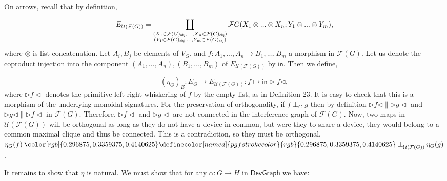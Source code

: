 \documentclass[10pt,a4paper]{article}
\begin{document}
On arrows, recall that by definition,\par
    \[E_{\mathcal{U}(\mathcal{F}(G))}=\coprod_{\begin{subarray}{c}(X_{1}\in\mathcal{F}(G)_{\mathsf{obj}},...,X_{n}\in\mathcal{F}(G)_{\mathsf{obj}})\\
(Y_{1}\in\mathcal{F}(G)_{\mathsf{obj}},...,Y_{m}\in\mathcal{F}(G)_{\mathsf{obj}})\end{subarray}}\mathcal{F}G(X_{1}\otimes...\otimes X_{n};Y_{1}\otimes...\otimes Y_{m}),\]    
where $\otimes$ is list concatenation. Let $A_{i},B_{j}$ be elements of $V_{G}$, and $f:A_{1},...,A_{n}\to B_{1},...,B_{m}$ a morphism in $\mathcal{F}(G)$. Let us denote the coproduct injection into the component $(A_{1},...,A_{n}),(B_{1},...,B_{m})$ of $E_{\mathcal{U}(\mathcal{F}(G))}$ by $\mathsf{in}$. Then we define,\par
    \[(\eta_{G})_{E}:E_{G}\to E_{\mathcal{U}(\mathcal{F}(G))}:f\mapsto{\mathsf{in}}\triangleright f\triangleleft,\]    
where $\triangleright f\triangleleft$ denotes the primitive left-right whiskering of $f$ by the empty list, as in Definition 23. It is easy to check that this is a morphism of the underlying monoidal signatures. For the preservation of orthogonality, if $f\perp_{G}g$ then by definition $\triangleright f\triangleleft\parallel\triangleright g\triangleleft$ and $\triangleright g\triangleleft\parallel\triangleright f\triangleleft$ in $\mathcal{F}(G)$. Therefore, $\triangleright f\triangleleft$ and $\triangleright g\triangleleft$ are not connected in the interference graph of $\mathcal{F}(G)$. Now, two maps in $\mathcal{U}(\mathcal{F}(G))$ will be orthogonal as long as they do not have a device in common, but were they to share a device, they would belong to a common maximal clique and thus be connected. This is a contradiction, so they must be orthogonal, $\eta_{G}(f)\mathbin{{\color[rgb]{0.296875,0.3359375,0.4140625}\definecolor[named]{pgfstrokecolor}{rgb}{0.296875,0.3359375,0.4140625}\perp}_{\mathcal{U}(\mathcal{F}(G))}}\eta_{G}(g)$.\par
 
 
 
It remains to show that $\eta$ is natural. We must show that for any $\alpha:G\to H$ in $\mathsf{DevGraph}$ we have:\par
 
 
 
\end{document}
